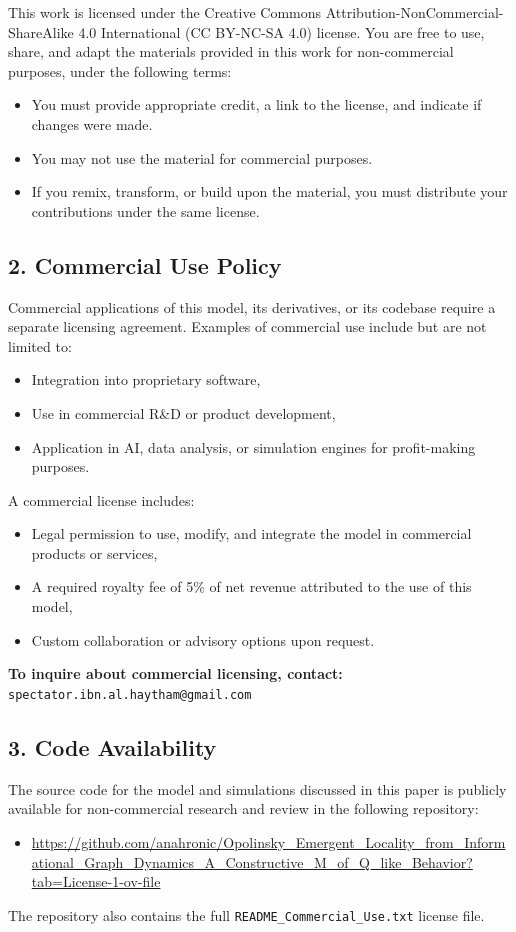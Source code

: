 \documentclass[12pt]{article}
\begin{document}
This work is licensed under the Creative Commons Attribution-NonCommercial-ShareAlike 4.0 International (CC BY-NC-SA 4.0) license.  
You are free to use, share, and adapt the materials provided in this work for non-commercial purposes, under the following terms:
\begin{itemize}
    \item You must provide appropriate credit, a link to the license, and indicate if changes were made.
    \item You may not use the material for commercial purposes.
    \item If you remix, transform, or build upon the material, you must distribute your contributions under the same license.
\end{itemize}

\subsection*{2. Commercial Use Policy}

Commercial applications of this model, its derivatives, or its codebase require a separate licensing agreement.  
Examples of commercial use include but are not limited to:
\begin{itemize}
    \item Integration into proprietary software,
    \item Use in commercial R\&D or product development,
    \item Application in AI, data analysis, or simulation engines for profit-making purposes.
\end{itemize}

A commercial license includes:
\begin{itemize}
    \item Legal permission to use, modify, and integrate the model in commercial products or services,
    \item A required royalty fee of 5\% of net revenue attributed to the use of this model,
    \item Custom collaboration or advisory options upon request.
\end{itemize}

\noindent\textbf{To inquire about commercial licensing, contact:}  
\texttt{spectator.ibn.al.haytham@gmail.com}

\subsection*{3. Code Availability}

The source code for the model and simulations discussed in this paper is publicly available for non-commercial research and review in the following repository:
\begin{itemize}
    \item \url{https://github.com/anahronic/Opolinsky_Emergent_Locality_from_Informational_Graph_Dynamics_A_Constructive_M_of_Q_like_Behavior?tab=License-1-ov-file} 
\end{itemize}
The repository also contains the full \texttt{README\_Commercial\_Use.txt} license file.
\end{document}
